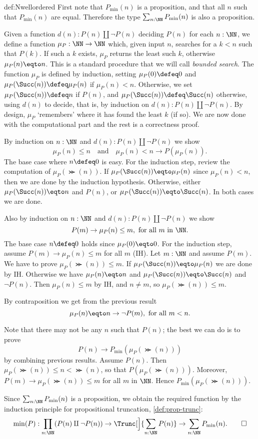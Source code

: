 \begin{implementation}{def:Nwellordered}
First note that $P_{\min}(n)$ is a proposition,
and that all $n$ such that $P_{\min}(n)$
are equal. Therefore the type $\sum_{n:\NN} P_{\min}(n)$
is also a proposition.

Given a function $d(n): P(n)\amalg\neg P(n)$ deciding $P(n)$ for each $n:\NN$,
we define a function $\mu_P:\NN\to\NN$ which,
given input $n$, searches for a $k<n$ such that $P(k)$.
If such a $k$ exists, $\mu_P$ returns the least such $k$,
otherwise $\mu_P(n) \eqto n$.
This is a standard procedure that we will call \emph{bounded search}.
The function $\mu_P$ is defined by induction, setting
$\mu_P(0)\defeq 0$ and
$\mu_P(\Succ(n))\defeq \mu_P(n)$ if $\mu_P(n) < n$.
Otherwise, we set $\mu_P(\Succ(n))\defeq n$ if $P(n)$,
and $\mu_P(\Succ(n))\defeq \Succ(n)$ otherwise, using $d(n)$ to decide,
that is, by induction on $d(n):P(n)\amalg\neg P(n)$.
By design, $\mu_P$ `remembers' where it has found the least $k$ (if so).
We are now done with the computational part and the rest
is a correctness proof.

By induction on $n:\NN$ and $d(n): P(n)\amalg\neg P(n)$ we show
\[
\mu_P(n)\leq n \quad\text{and}\quad \mu_P(n)<n \to P(\mu_P(n)).
\]
The base case where $n \defeq 0$ is easy. For the induction step,
review the computation of $\mu_P(\Succ(n))$. If $\mu_P(\Succ(n)) \eqto \mu_P(n)$
since $\mu_P(n) < n$, then we are done by the induction hypothesis.
Otherwise, either $\mu_P(\Succ(n)) \eqto n$ and $P(n)$, or $\mu_P(\Succ(n)) \eqto \Succ(n)$.
In both cases we are done.

Also by induction on $n:\NN$ and $d(n): P(n)\amalg\neg P(n)$ we show
\[
P(m) \to \mu_P(n)\leq m,~ \text{for all $m$ in $\NN$.}
\]
The base case $n \defeq 0$ holds since $\mu_P(0) \eqto 0$. For the induction step,
assume $P(m) \to \mu_P(n)\leq m$ for all $m$ (IH). Let $m:\NN$
and assume $P(m)$. We have to prove $\mu_P(\Succ(n))\leq m$.
If $\mu_P(\Succ(n)) \eqto \mu_P(n)$ we are done by IH. Otherwise we have
$\mu_P(n) \eqto n$ and $\mu_P(\Succ(n)) \eqto \Succ(n)$ and $\neg P(n)$.
Then $\mu_P(n)\leq m$ by IH, and $n\neq m$, so $\mu_P(\Succ(n))\leq m$.

By contraposition we get from the previous result
\[
\mu_P(n) \eqto n \to \neg P(m),~\text{for all $m<n$.}
\]

Note that there may not be any $n$ such that $P(n)$;
the best we can do is to prove
\[
P(n)\to P_{\min}(\mu_P(\Succ(n)))
\]
by combining previous results. Assume $P(n)$.
Then $\mu_P(\Succ(n))\leq n < \Succ(n)$, so that $P(\mu_P(\Succ(n)))$.
Moreover, $P(m) \to \mu_P(\Succ(n))\leq m$ for all $m$ in $\NN$.
Hence $P_{\min}(\mu_P(\Succ(n)))$.

Since $\sum_{n:\NN} P_{\min}(n)$ is a proposition,
we obtain the required function by the induction
principle for propositional truncation, \cref{def:prop-trunc}:
\[
\min(P) : \prod_{n:\NN}(P(n)\amalg\neg P(n)) \to
           \Trunc[\Big]{\sum_{n:\NN} P(n)} \to  \sum_{n:\NN} P_{\min}(n).\qedhere
\]
\end{implementation}

